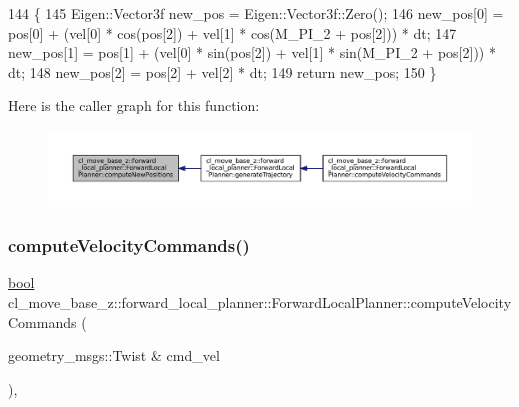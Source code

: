 \begin{DoxyCode}
144 \{
145     Eigen::Vector3f new\_pos = Eigen::Vector3f::Zero();
146     new\_pos[0] = pos[0] + (vel[0] * cos(pos[2]) + vel[1] * cos(M\_PI\_2 + pos[2])) * dt;
147     new\_pos[1] = pos[1] + (vel[0] * sin(pos[2]) + vel[1] * sin(M\_PI\_2 + pos[2])) * dt;
148     new\_pos[2] = pos[2] + vel[2] * dt;
149     \textcolor{keywordflow}{return} new\_pos;
150 \}
\end{DoxyCode}
Here is the caller graph for this function\+:
\nopagebreak
\begin{figure}[H]
\begin{center}
\leavevmode
\includegraphics[width=350pt]{classcl__move__base__z_1_1forward__local__planner_1_1ForwardLocalPlanner_a07074f6a5a6cc1de035e09822d647158_icgraph}
\end{center}
\end{figure}
\mbox{\label{classcl__move__base__z_1_1forward__local__planner_1_1ForwardLocalPlanner_a1b87a4f9f107c7727c155c4afcb90700}} 
\subsubsection{\texorpdfstring{compute\+Velocity\+Commands()}{computeVelocityCommands()}}
{\footnotesize\ttfamily \hyperlink{classbool}{bool} cl\+\_\+move\+\_\+base\+\_\+z\+::forward\+\_\+local\+\_\+planner\+::\+Forward\+Local\+Planner\+::compute\+Velocity\+Commands (\begin{DoxyParamCaption}\item[{geometry\+\_\+msgs\+::\+Twist \&}]{cmd\+\_\+vel }\end{DoxyParamCaption})\hspace{0.3cm}{\ttfamily [override]}, {\ttfamily [virtual]}}



